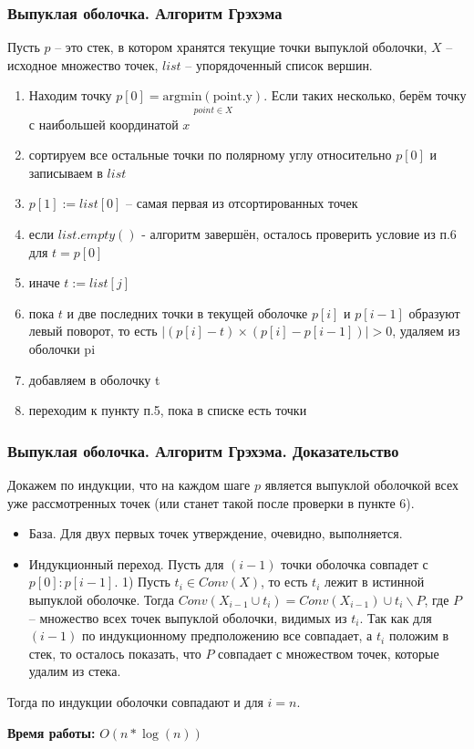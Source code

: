 \documentclass[notheorems,aspectratio=169]{beamer}
\begin{document}
\begin{frame}\frametitle{Выпуклая оболочка. Алгоритм Грэхэма}
	Пусть $p$ -- это стек, в котором хранятся текущие точки выпуклой оболочки, 
	$X$ -- исходное множество точек, $list$ -- упорядоченный список вершин.
	\begin{enumerate}
		\item Находим точку $p[0] = \underset{point \in X}{\operatorname{argmin(point.y)}} $. Если таких несколько, берём точку с наибольшей координатой $x$
		\item сортируем все остальные точки по полярному углу относительно $p[0]$ и записываем в $list$
		\item $p[1] := list[0]$ -- самая первая из отсортированных точек
		\item если $list.empty()$ - алгоритм завершён, осталось проверить условие из п.6 для $t = p[0]$
		\item иначе $t := list[j]$
		\item пока $t$ и две последних точки 
		в текущей оболочке $p[i]$ и $p[i - 1]$ образуют левый поворот, то есть 
		$|\left(p[i] - t\right) \times \left(p[i] - p[i - 1]\right)| > 0$, удаляем из оболочки pi
		\item добавляем в оболочку t
		\item переходим к пункту п.5, пока в списке есть точки
	\end{enumerate}
\end{frame}

\begin{frame}\frametitle{Выпуклая оболочка. Алгоритм Грэхэма. Доказательство}
	Докажем по индукции, что на каждом шаге $p$ является выпуклой оболочкой всех уже рассмотренных точек (или станет такой после проверки в пункте 6).
	\begin{itemize}
		\item База. Для двух первых точек утверждение, очевидно, выполняется.
		\item Индукционный переход. Пусть для $(i - 1)$ точки оболочка совпадет с $p[0]:p[i-1]$.
		1) Пусть $t_{i} \in Conv(X)$, то есть $t_{i}$ лежит в истинной выпуклой оболочке. 
		Тогда $Conv(X_{i-1} \cup t_{i}) = Conv(X_{i-1}) \cup t_{i} \backslash P$, где $P$ -- множество всех
		точек выпуклой оболочки, видимых из $t_{i}$. Так как для $(i-1)$ по индукционному предположению
		все совпадает, а $t_{i}$ положим в стек, то осталось показать, что $P$ совпадает с множеством точек,
		которые удалим из стека. 
	\end{itemize}
	Тогда по индукции оболочки совпадают и для $i = n$.
	
	\textbf{Время работы:} $O\left(n*\log(n)\right)$
\end{frame}
\end{document}
